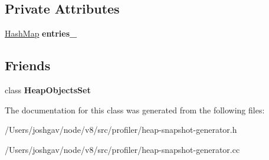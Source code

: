 \subsection*{Private Attributes}
\begin{DoxyCompactItemize}
\item 
\hyperlink{classv8_1_1internal_1_1_template_hash_map_impl}{Hash\+Map} {\bfseries entries\+\_\+}\hypertarget{classv8_1_1internal_1_1_heap_entries_map_aacae1823fe28c25531c21a6ef3664c45}{}\label{classv8_1_1internal_1_1_heap_entries_map_aacae1823fe28c25531c21a6ef3664c45}

\end{DoxyCompactItemize}
\subsection*{Friends}
\begin{DoxyCompactItemize}
\item 
class {\bfseries Heap\+Objects\+Set}\hypertarget{classv8_1_1internal_1_1_heap_entries_map_aa92f9dd7ce94ea20ac88110127675abc}{}\label{classv8_1_1internal_1_1_heap_entries_map_aa92f9dd7ce94ea20ac88110127675abc}

\end{DoxyCompactItemize}


The documentation for this class was generated from the following files\+:\begin{DoxyCompactItemize}
\item 
/\+Users/joshgav/node/v8/src/profiler/heap-\/snapshot-\/generator.\+h\item 
/\+Users/joshgav/node/v8/src/profiler/heap-\/snapshot-\/generator.\+cc\end{DoxyCompactItemize}
